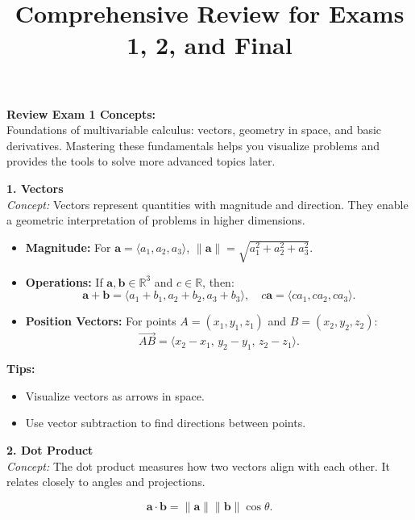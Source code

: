 \documentclass[9pt]{article}
\title{\footnotesize \textbf{Comprehensive Review for Exams 1, 2, and Final}}
\date{}
\begin{document}
\maketitle
\vspace{-15pt}

\begin{multicols}{2}
\footnotesize

\noindent \textbf{Review Exam 1 Concepts:}\\
Foundations of multivariable calculus: vectors, geometry in space, and basic derivatives. Mastering these fundamentals helps you visualize problems and provides the tools to solve more advanced topics later.

\begin{tcolorbox}[title=, colframe=brightblue]
\textbf{1. Vectors}\\
\textit{Concept:} Vectors represent quantities with magnitude and direction. They enable a geometric interpretation of problems in higher dimensions.

\begin{itemize}
    \item \textbf{Magnitude:} For $\mathbf{a}=\langle a_1,a_2,a_3\rangle$, $\|\mathbf{a}\|=\sqrt{a_1^2+a_2^2+a_3^2}$.
    \item \textbf{Operations:} If $\mathbf{a},\mathbf{b}\in\mathbb{R}^3$ and $c\in\mathbb{R}$, then:
    \[
    \mathbf{a}+\mathbf{b}=\langle a_1+b_1,a_2+b_2,a_3+b_3\rangle,\quad c\mathbf{a}=\langle ca_1,ca_2,ca_3\rangle.
    \]
    \item \textbf{Position Vectors:} For points $A=(x_1,y_1,z_1)$ and $B=(x_2,y_2,z_2)$:
    \[
    \overrightarrow{AB}=\langle x_2 - x_1,\, y_2 - y_1,\, z_2 - z_1\rangle.
    \]
\end{itemize}

\textbf{Tips:}
\begin{itemize}
    \item Visualize vectors as arrows in space.
    \item Use vector subtraction to find directions between points.
\end{itemize}
\end{tcolorbox}

\begin{tcolorbox}[title=, colframe=brightgreen]
\textbf{2. Dot Product}\\
\textit{Concept:} The dot product measures how two vectors align with each other. It relates closely to angles and projections.

\[
\mathbf{a}\cdot \mathbf{b}=\|\mathbf{a}\|\|\mathbf{b}\|\cos\theta.
\]


\end{tcolorbox}
\end{multicols}
\end{document}
